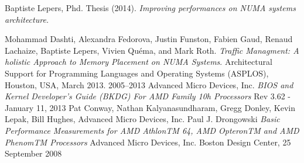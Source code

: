 \newpage
\begin{thebibliography}{99}

   Baptiste Lepers, Phd. Thesis (2014).
    \newblock \textit{Improving performances on NUMA systems architecture.}
  
   Mohammad Dashti, Alexandra Fedorova, Justin Funston,
    Fabien Gaud, Renaud Lachaize, Baptiste Lepers, Vivien Quéma, and Mark
    Roth.
    \newblock \textit{Traffic Managment: A holistic Approach to Memory
      Placement on NUMA Systems}.
    \newblock Architectural Support for Programming Languages and Operating
    Systems (ASPLOS), Houston, USA, March 2013.
   2005–2013 Advanced Micro Devices, Inc.
  	\newblock \textit{BIOS and Kernel Developer’s Guide (BKDG) For AMD Family 10h Processors}
  	Rev 3.62  - January 11, 2013
  Pat Conway, Nathan Kalyanasundharam, Gregg Donley, Kevin Lepak, Bill Hughes, Advanced Micro Devices, Inc.
  Paul J. Drongowski
  	\newblock \textit{Basic Performance Measurements for AMD AthlonTM 64, AMD OpteronTM and AMD PhenomTM Processors}
  	Advanced Micro Devices, Inc. Boston Design Center, 25 September 2008


\end{thebibliography}
